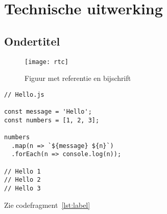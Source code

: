 
\section{Technische uitwerking} %
\label{sec:uitwerking}

\subsection{Ondertitel} %
\label{sub:ondertitel}

\lipsum[1]

\begin{figure}[H]
  \label{figure:golden-circle}
  \centering
  \texttt{[image: rtc]}
  \caption{Figuur met referentie en bijschrift \cite{voorbeeld-ref}}
\end{figure}

\begin{lstlisting}[caption={Some Javascript code},label={lst:label}]
// Hello.js

const message = 'Hello';
const numbers = [1, 2, 3];

numbers
  .map(n => `${message} ${n}`)
  .forEach(n => console.log(n));

// Hello 1
// Hello 2
// Hello 3
\end{lstlisting}

Zie codefragment~\ref{lst:label}

\lipsum[1]
